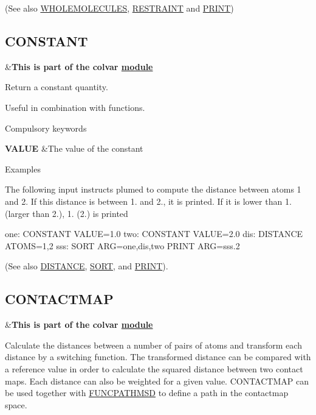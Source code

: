 (See also \hyperlink{WHOLEMOLECULES}{W\+H\+O\+L\+E\+M\+O\+L\+E\+C\+U\+L\+E\+S}, \hyperlink{RESTRAINT}{R\+E\+S\+T\+R\+A\+I\+N\+T} and \hyperlink{PRINT}{P\+R\+I\+N\+T}) \hypertarget{CONSTANT}{}\subsection{C\+O\+N\+S\+T\+A\+N\+T}\label{CONSTANT}
\begin{TabularC}{2}
\hline
&{\bfseries  This is part of the colvar \hyperlink{mymodules}{module }}   \\
\end{TabularC}
Return a constant quantity.

Useful in combination with functions.

\begin{DoxyParagraph}{Compulsory keywords}

\end{DoxyParagraph}
\begin{TabularC}{2}
\hline
{\bfseries  V\+A\+L\+U\+E } &The value of the constant   \\
\end{TabularC}


\begin{DoxyParagraph}{Examples}

\end{DoxyParagraph}
The following input instructs plumed to compute the distance between atoms 1 and 2. If this distance is between 1. and 2., it is printed. If it is lower than 1. (larger than 2.), 1. (2.) is printed

\begin{DoxyVerb}one: CONSTANT VALUE=1.0
two: CONSTANT VALUE=2.0
dis: DISTANCE ATOMS=1,2
sss: SORT ARG=one,dis,two
PRINT ARG=sss.2
\end{DoxyVerb}
 (See also \hyperlink{DISTANCE}{D\+I\+S\+T\+A\+N\+C\+E}, \hyperlink{SORT}{S\+O\+R\+T}, and \hyperlink{PRINT}{P\+R\+I\+N\+T}). \hypertarget{CONTACTMAP}{}\subsection{C\+O\+N\+T\+A\+C\+T\+M\+A\+P}\label{CONTACTMAP}
\begin{TabularC}{2}
\hline
&{\bfseries  This is part of the colvar \hyperlink{mymodules}{module }}   \\
\end{TabularC}
Calculate the distances between a number of pairs of atoms and transform each distance by a switching function. The transformed distance can be compared with a reference value in order to calculate the squared distance between two contact maps. Each distance can also be weighted for a given value. C\+O\+N\+T\+A\+C\+T\+M\+A\+P can be used together with \hyperlink{FUNCPATHMSD}{F\+U\+N\+C\+P\+A\+T\+H\+M\+S\+D} to define a path in the contactmap space.

